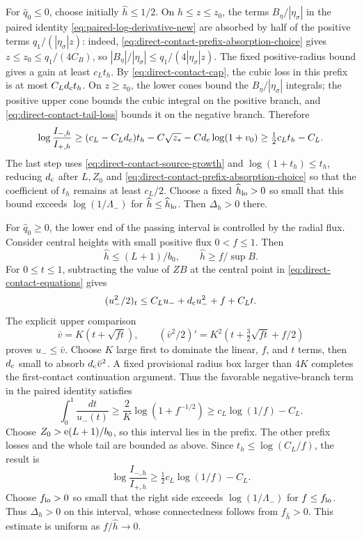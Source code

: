 For \(\widehat q_0\le0\), choose initially \(\widehat h\le1/2\).
On \(h\le z\le z_0\), the terms \(B_\eta/|\eta_\sigma|\) in the
paired identity \eqref{eq:paired-log-derivative-new} are absorbed
by half of the positive terms \(q_1/(|\eta_\sigma|z)\): indeed,
\eqref{eq:direct-contact-prefix-absorption-choice} gives
\(z\le z_0\le q_1/(4C_B)\), so
\( |B_\eta|/|\eta_\sigma|\le q_1/(4|\eta_\sigma|z)\).
The fixed positive-radius bound
gives a gain at least \(c_Lt_h\). By
\eqref{eq:direct-contact-cap}, the cubic loss in this prefix is at most
\(C_Ld_{\rm c} t_h\). On \(z\ge z_0\), the lower cones bound the
\(B_\eta/|\eta_\sigma|\) integrals; the positive upper cone bounds
the cubic integral on the positive branch, and
\eqref{eq:direct-contact-tail-loss} bounds it on the negative branch.
Therefore
\[
 \log\frac{I_{-,h}}{I_{+,h}}
 \ge (c_L-C_Ld_{\rm c})t_h-C\sqrt{z_*}-Cd_{\rm c}\log(1+v_0)
 \ge \tfrac12c_Lt_h-C_L .
\]
The last step uses \eqref{eq:direct-contact-source-growth} and
\(\log(1+t_h)\le t_h\), reducing \(d_{\rm c}\) after \(L,Z_0\) and
\eqref{eq:direct-contact-prefix-absorption-choice} so that the
coefficient of \(t_h\) remains at least \(c_L/2\).
Choose a fixed \(\widehat h_{\rm lo}>0\)
so small that this bound exceeds \(\log(1/\Lambda_-)\) for
\(\widehat h\le \widehat h_{\rm lo}\). Then \(\Delta_h>0\) there.

For \(\widehat q_0\ge0\), the lower end of the passing interval is
controlled by the radial flux. Consider central heights with small positive flux
\(0<f\le1\). Then
\[
 \widehat h\le (L+1)/b_0,\qquad \widehat h\ge f/\sup B .
\]
For \(0\le t\le1\), subtracting the value of \(ZB\)
at the central point in \eqref{eq:direct-contact-equations} gives
\[
 (u_-^2/2)_t\le C_Lu_-+d_{\rm c}u_-^2+f+C_Lt .
\]
The explicit upper comparison
\[
 \bar v=K(t+\sqrt{ft}),\qquad
 (\bar v^2/2)'=K^2(t+\tfrac32\sqrt{ft}+f/2)
\]
proves \(u_-\le\bar v\). Choose \(K\) large first to dominate the
linear, \(f\), and \(t\) terms, then \(d_{\rm c}\) small to absorb
\(d_{\rm c}\bar v^2\). A fixed provisional radius box larger than
\(4K\) completes the first-contact continuation argument.
Thus the favorable negative-branch term in the paired identity
satisfies
\[
 \int_0^1\frac{dt}{u_-(t)}
 \ge \frac2K\log(1+f^{-1/2})
 \ge c_L\log(1/f)-C_L .
\]
Choose \(Z_0>\mathrm e(L+1)/b_0\), so this interval lies in the prefix.
The other prefix losses and the whole tail are bounded
as above. Since \(t_h\le\log(C_L/f)\), the result is
\begin{equation}
\label{eq:direct-contact-flux-gain}
 \log\frac{I_{-,h}}{I_{+,h}}
 \ge \tfrac12c_L\log(1/f)-C_L .
\end{equation}
Choose \(f_{\rm lo}>0\) so small that the right side exceeds
\(\log(1/\Lambda_-)\) for \(f\le f_{\rm lo}\). Thus \(\Delta_h>0\)
on this interval, whose connectedness follows from \(f_{\widehat h}>0\).
This estimate is uniform as \(f/\widehat h\to0\).

